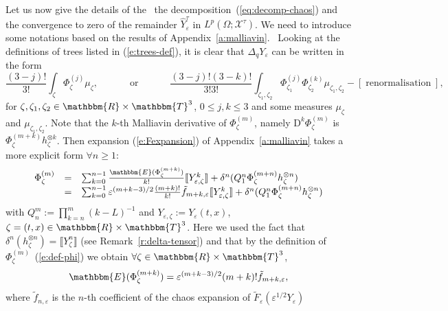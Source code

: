 \documentclass[a4paper,11pt]{article}
\newcommand{\assign}{:=}
\newcommand{\mathD}{\mathrm{D}}
\newcommand{\tmop}[1]{\ensuremath{\operatorname{#1}}}
\begin{document}
Let us now give the details of the \ the decomposition~(\ref{eq:decomp-chaos})
and the convergence to zero of the remainder $\hat{Y}^{\tau}_{\varepsilon}$ in
$L^p (\Omega ; \mathcal{X}^{\tau})$. We need to introduce some notations based
on the results of Appendix~\ref{a:malliavin}. \ Looking at the definitions of
trees listed in (\ref{e:trees-def}), it is clear that $\Delta_q
Y_{\varepsilon}$ can be written in the form
\[ \frac{(3 - j) !}{3!} \int_{\zeta} \Phi^{(j)}_{\zeta} \mu_{\zeta},
   \hspace{3em} \tmop{or} \hspace{3em} \frac{(3 - j) ! (3 - k) !}{3!3!}
   \int_{\zeta_1, \zeta_2} \Phi^{(j)}_{\zeta_1} \Phi^{(k)}_{\zeta_2}
   \mu_{\zeta_1, \zeta_2} - [\tmop{renormalisation}], \]
for $\zeta, \zeta_1, \zeta_2 \in \mathbbm{R} \times \mathbbm{T}^3$, $0
\leqslant j, k \leqslant 3$ and some measures $\mu_{\zeta}$ and $\mu_{\zeta_1,
\zeta_2}$. Note that the $k$-th Malliavin derivative of $\Phi_{\zeta}^{(m)}$,
namely $\mathD^k \Phi^{(m)}_{\zeta}$ is $\Phi^{(m + k)}_{\zeta}
h_{\zeta}^{\otimes k}$. Then expansion (\ref{e:Fexpansion}) of
Appendix~\ref{a:malliavin} takes a more explicit form $\forall n \geqslant 1$:
\begin{equation}
  \begin{array}{lll}
    \Phi_{\zeta}^{(m)} & = & \sum_{k = 0}^{n - 1} \frac{\mathbbm{E} (\Phi^{(m
    + k)}_{\zeta})}{k!} \llbracket Y^k_{\varepsilon, \zeta} \rrbracket +
    \delta^n (Q_1^n \Phi^{(m + n)}_{\zeta} h_{\zeta}^{\otimes n})\\
    & = & \sum_{k = 0}^{n - 1} \varepsilon^{(m + k - 3) / 2} \frac{(m + k)
    !}{k!} \tilde{f}_{m + k, \varepsilon} \llbracket Y^k_{\varepsilon, \zeta}
    \rrbracket + \delta^n (Q_1^n \Phi^{(m + n)}_{\zeta} h_{\zeta}^{\otimes n})
  \end{array} \label{e:Fexp-explicit}
\end{equation}
with $Q_n^m \assign \prod_{k = n}^m (k - L)^{- 1}$ and $Y_{\varepsilon, \zeta}
\assign Y_{\varepsilon} (t, x)$, $\zeta = (t, x) \in \mathbbm{R} \times
\mathbbm{T}^3$. Here we used the fact that $\delta^n (h_{\zeta}^{\otimes n}) =
\llbracket Y^n_{\zeta} \rrbracket$ (see Remark~\ref{r:delta-tensor}) and that
by the definition of $\Phi^{(m)}_{\zeta}$~(\ref{e:def-phi}) we obtain $\forall
\zeta \in \mathbbm{R} \times \mathbbm{T}^3$,
\[ \mathbbm{E} (\Phi^{(m + k)}_{\zeta}) = \varepsilon^{(m + k - 3) / 2}  (m +
   k) ! \tilde{f}_{m + k, \varepsilon}, \]
where $\tilde{f}_{n, \varepsilon}$ is the $n$-th coefficient of the chaos
expansion of $\tilde{F}_{\varepsilon} (\varepsilon^{1 / 2} Y_{\varepsilon})$
\end{document}
